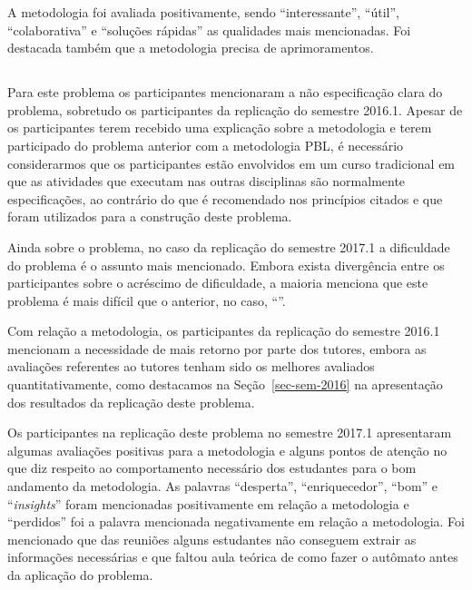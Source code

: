 A metodologia foi avaliada positivamente, sendo
``interessante'', ``útil'', ``colaborativa'' e ``soluções rápidas''
as qualidades mais mencionadas.
Foi destacada também que a metodologia precisa de
aprimoramentos.

\subsection{\ProblemaB}

Para este problema os participantes mencionaram a não especificação clara
do problema, sobretudo os participantes da replicação do semestre 2016.1.
Apesar de os participantes terem recebido
uma explicação sobre a metodologia e terem participado
do problema anterior com a metodologia \ac{PBL}, é necessário considerarmos
que os participantes estão envolvidos em um curso tradicional
em que as atividades que executam nas outras disciplinas são normalmente
especificações, ao contrário do que é recomendado nos princípios
citados  e que foram utilizados para
a construção deste problema.

Ainda sobre o problema, no caso da replicação do semestre 2017.1 a dificuldade
do problema é o assunto mais mencionado.
Embora exista divergência entre os participantes
sobre o acréscimo de dificuldade, a maioria menciona que este
problema é mais difícil que o anterior, no caso, ``\ProblemaG''.

Com relação a metodologia, os participantes da replicação do semestre 2016.1
mencionam a necessidade de mais retorno por parte dos tutores,
embora as avaliações referentes ao tutores tenham sido
os melhores avaliados quantitativamente, como destacamos
na Seção~\ref{sec-sem-2016} na apresentação dos resultados
da replicação deste problema.

Os participantes na replicação deste problema no semestre 2017.1
apresentaram algumas avaliações positivas para a metodologia
e alguns pontos de atenção no que diz respeito ao
comportamento necessário dos estudantes para o bom
andamento da metodologia.
As palavras ``desperta'', ``enriquecedor'', ``bom'' e ``\textit{insights}''
foram mencionadas positivamente em relação a metodologia e ``perdidos''
foi a palavra mencionada negativamente em relação a metodologia.
Foi mencionado que das reuniões alguns estudantes não conseguem
extrair as informações necessárias e que faltou aula teórica
de como fazer o autômato antes da aplicação do problema.

